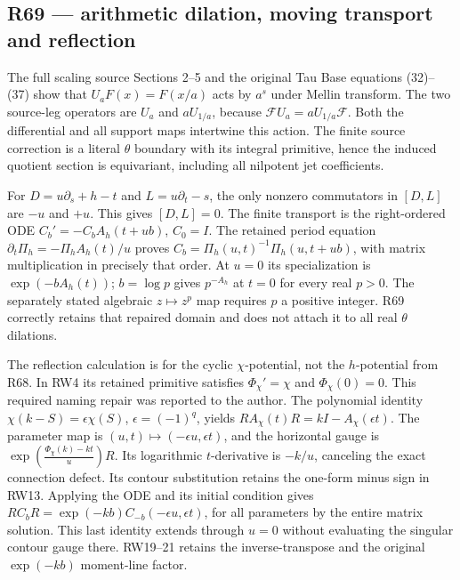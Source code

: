 \subsection{R69 --- arithmetic dilation, moving transport and
reflection}\label{r69-arithmetic-dilation-moving-transport-and-reflection}

The full scaling source Sections 2--5 and the original Tau Base
equations (32)--(37) show that \(U_a F(x)=F(x/a)\) acts by \(a^s\) under
Mellin transform. The two source-leg operators are \(U_a\) and
\(aU_{1/a}\), because \(\mathcal F U_a=aU_{1/a}\mathcal F\). Both the
differential and all support maps intertwine this action. The finite
source correction is a literal \(\theta\) boundary with its integral
primitive, hence the induced quotient section is equivariant, including
all nilpotent jet coefficients.

For \(D=u\partial_s+h-t\) and \(L=u\partial_t-s\), the only nonzero
commutators in \([D,L]\) are \(-u\) and \(+u\). This gives \([D,L]=0\).
The finite transport is the right-ordered ODE \(C_b'=-C_b A_h(t+ub)\),
\(C_0=I\). The retained period equation
\(\partial_t\Pi_h=-\Pi_h A_h(t)/u\) proves
\(C_b=\Pi_h(u,t)^{-1}\Pi_h(u,t+ub)\), with matrix multiplication in
precisely that order. At \(u=0\) its specialization is
\(\exp(-b A_h(t))\); \(b=\log p\) gives \(p^{-A_h}\) at \(t=0\) for
every real \(p>0\). The separately stated algebraic \(z\mapsto z^p\) map
requires \(p\) a positive integer. R69 correctly retains that repaired
domain and does not attach it to all real \(\theta\) dilations.

The reflection calculation is for the cyclic \(\chi\)-potential, not the
\(h\)-potential from R68. In RW4 its retained primitive satisfies
\(\Phi_\chi'=\chi\) and \(\Phi_\chi(0)=0\). This required naming repair
was reported to the author. The polynomial identity
\(\chi(k-S)=\epsilon\chi(S)\), \(\epsilon=(-1)^q\), yields
\(R A_\chi(t)R=kI-A_\chi(\epsilon t)\). The parameter map is
\((u,t)\mapsto(-\epsilon u,\epsilon t)\), and the horizontal gauge is
\(\exp\!\left(\frac{\Phi_\chi(k)-kt}{u}\right)R\). Its logarithmic
\(t\)-derivative is \(-k/u\), canceling the exact connection defect. Its
contour substitution retains the one-form minus sign in RW13. Applying
the ODE and its initial condition gives
\(R C_b R=\exp(-kb)C_{-b}(-\epsilon u,\epsilon t)\), for all parameters
by the entire matrix solution. This last identity extends through
\(u=0\) without evaluating the singular contour gauge there. RW19--21
retains the inverse-transpose and the original \(\exp(-kb)\) moment-line
factor.

